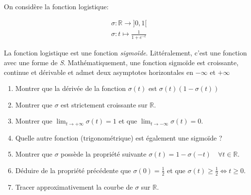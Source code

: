 \documentclass[solutions]{../exercices}
\begin{document}

\begin{exercice}
On considère la fonction logistique: 

\begin{equation}
	\begin{aligned}
		&\sigma: \mathbb{R} \to ]0, 1[ \\
		&\sigma : t \mapsto \frac{1}{1 + e^{-t}}
	\end{aligned}
	\nonumber
\end{equation}

La fonction logistique est une fonction \textit{sigmoïde}. Littéralement, c'est une fonction avec une forme de \textit{S}. Mathématiquement, une fonction sigmoïde est croissante, continue et dérivable et admet deux asymptotes horizontales en $-\infty$ et $+\infty$

\begin{enumerate}
	\item Montrer que la dérivée de la fonction $\sigma(t)$ est $\sigma(t) \left(1 - \sigma(t)\right)$
	\item Montrer que $\sigma$ est strictement croissante sur $\mathbb{R}$.
	\item Montrer que $\lim_{t \rightarrow + \infty} \sigma(t) = 1$ et que $\lim_{t \rightarrow - \infty} \sigma(t) = 0$.
	\item Quelle autre fonction (trigonométrique) est également une sigmoïde ?
	\item Montrer que $\sigma$ possède la propriété suivante $\sigma(t) = 1 - \sigma(-t) \quad \forall t \in \mathbb{R}$.
	\item Déduire de la propriété précédente que $\sigma(0) = \frac{1}{2}$ et que $\sigma(t) \ge \frac{1}{2} \Longleftrightarrow t \ge 0$.
	\item Tracer approximativement la courbe de $\sigma$ sur $\mathbb{R}$.
\end{enumerate}
\end{exercice}
\end{document}
